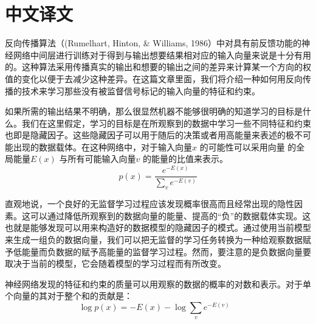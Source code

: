 \chapter*{中文译文}
\setcounter{equation}{0}
\par{反向传播算法（(Rumelhart, Hinton, \& Williams, 1986）中对具有前反馈功能的神经网络中间层进行训练对于得到与输出想要结果相对应的输入向量来说是十分有用的。这种算法采用传播真实的输出和想要的输出之间的差异来计算某一个方向的权值的变化以便于去减少这种差异。在这篇文章里面，我们将介绍一种如何用反向传播的技术来学习那些没有被监督信号标记的输入向量的特征和约束。}
\par{如果所需的输出结果不明确，那么很显然机器不能够很明确的知道学习的目标是什么。我们在这里假定，学习的目标是在所观察到的数据中学习一些不同特征和约束也即是隐藏因子。这些隐藏因子可以用于随后的决策或者用高能量来表述的极不可能出现的数据载体。在这种网络中，对于输入向量$x$ 的可能性可以采用向量 的全局能量$E(x)$ 与所有可能输入向量$v$ 的能量的比值来表示。
\begin{equation}\label{equation1}p(x) = \frac{{{e^{ - E(x)}}}}{{\sum\nolimits_v {{e^{ - E(v)}}} }}\end{equation}
}

\par{直观地说，一个良好的无监督学习过程应该发现概率很高而且经常出现的隐性因素。这可以通过降低所观察到的数据向量的能量、提高的“负”的数据载体实现。这也就是能够发现可以用来构造好的数据模型的隐藏因子的模式。通过使用当前模型来生成一组负的数据向量，我们可以把无监督的学习任务转换为一种给观察数据赋予低能量而负数据的赋予高能量的监督学习过程。然而，要注意的是负数据向量要取决于当前的模型，它会随着模型的学习过程而有所改变。}
\par{
神经网络发现的特征和约束的质量可以用观察的数据的概率的对数和表示。对于单个向量的其对于整个和的贡献是：
\begin{equation}\label{equation2}\log p(x) =  - E(x) - \log \sum\limits_v {{e^{ - E(v)}}} \;\;\;\end{equation}
}

